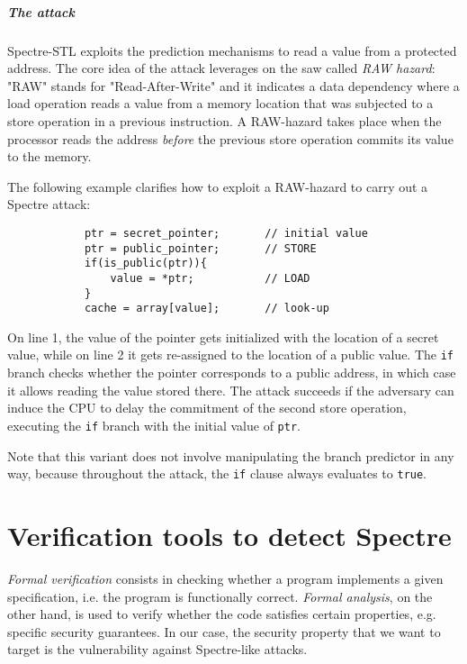 \documentclass[target=mst,aauheader=aics]{thud}
\theoremstyle{definition}
\begin{document}
	\paragraph{The attack} Spectre-STL exploits the prediction mechanisms to read a value from a protected address. The core idea of the attack leverages on the saw called \textit{RAW hazard}: "RAW" stands for "Read-After-Write" and it indicates a data dependency where a load operation reads a value from a memory location that was subjected to a store operation in a previous instruction. A RAW-hazard takes place when the processor reads the address \textit{before} the previous store operation commits its value to the memory.
	
	The following example clarifies how to exploit a RAW-hazard to carry out a Spectre attack:
	
	\vspace{3mm}
	\begin{minipage}{.6\textwidth}
		\begin{lstlisting}
			ptr = secret_pointer;		// initial value
			ptr = public_pointer;		// STORE
			if(is_public(ptr)){	
				value = *ptr;			// LOAD
			}
			cache = array[value];		// look-up
		\end{lstlisting}
	\end{minipage}
	
	On line 1, the value of the pointer gets initialized with the location of a secret value, while on line 2 it gets re-assigned to the location of a public value. The \texttt{if} branch checks whether the pointer corresponds to a public address, in which case it allows reading the value stored there. The attack succeeds if the adversary can induce the CPU to delay the commitment of the second store operation, executing the \texttt{if} branch with the initial value of \texttt{ptr}.
	
	Note that this variant does not involve manipulating the branch predictor in any way, because throughout the attack, the \texttt{if} clause always evaluates to \texttt{true}.
	
	\chapter{Verification tools to detect Spectre}\label{chapter:verification}
	
	\textit{Formal verification} consists in checking whether a program implements a given specification, i.e. the program is functionally correct. \textit{Formal analysis}, on the other hand, is used to verify whether the code satisfies certain properties, e.g. specific security guarantees. In our case, the security property that we want to target is the vulnerability against Spectre-like attacks. 
	
\end{document}
